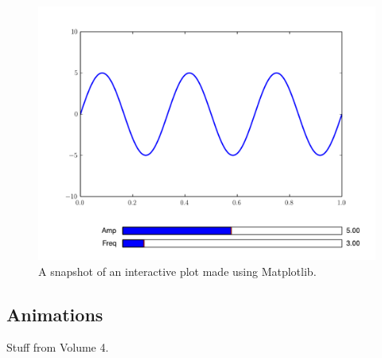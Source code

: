 \begin{figure}[H]
\includegraphics[width=.7\textwidth]{interact.pdf}
\caption{A snapshot of an interactive plot made using Matplotlib.}
\label{mpl:interact} \end{figure}


\subsection*{Animations} %

Stuff from Volume 4.

